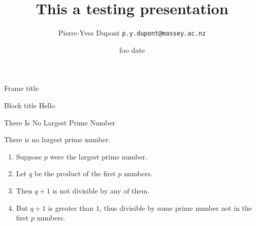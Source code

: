 \documentclass{beamer}
\title{This a testing presentation}
\date[date of today]{foo date}
\author[PY Dupont]{Pierre-Yves Dupont \texttt{p.y.dupont@massey.ac.nz}}
\begin{document}
\begin{frame}
\titlepage
\end{frame}

\begin{frame}{Frame title}
\begin{block}{Block title}
Hello
\end{block}
\end{frame}

\begin{frame}{There Is No Largest Prime Number} 
\begin{theorem}
There is no largest prime number. 
\end{theorem} 
\begin{enumerate} 
\item<1-> Suppose $p$ were the largest prime number. 
\item<2-> Let $q$ be the product of the first $p$ numbers. 
\item<3-> Then $q+1$ is not divisible by any of them. 
\item<4-> But $q + 1$ is greater than $1$, thus divisible by some prime number not in the first $p$ numbers.
\end{enumerate}
\end{frame}
% 
% 
% 
\end{document}
